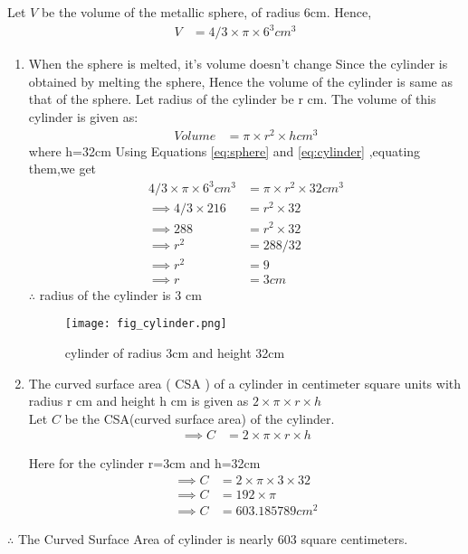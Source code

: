 \documentclass[journal,12pt,twocolumn]{IEEEtran}
\begin{document}
	Let $V$ be the volume of the metallic sphere, of radius 6cm. 
	Hence,
	\begin{align} V&=4/3 \times \pi \times 6^3 cm^3 
		\label{eq:sphere}
	\end{align} 
	\begin{enumerate}[label=(\roman*)]
		\item When the sphere is melted, it's volume doesn't change
		Since the cylinder is obtained by melting the sphere, Hence the volume of the cylinder is same as that of the sphere.
		Let radius of the cylinder be r cm.
		The volume of this cylinder is given as: 
		\begin{align} 
		Volume &= \pi \times r^2 \times h cm^3
			\label{eq:cylinder}
		\end{align}
		where h=32cm
		Using Equations 
		\eqref{eq:sphere} and 
		\eqref{eq:cylinder} 
		,equating them,we get 
		\begin{align}
		4/3 \times \pi \times 6^3 cm^3&=\pi \times r^2 \times 32 cm^3
			\\
		\implies 4/3 \times 216&=r^2 \times 32
			\\
		\implies 288&= r^2 \times 32
			\\
		\implies r^2&= 288/32
			\\
		\implies r^2&=9
			\\
		\implies r&=3cm
		\end{align} 
	$\therefore$  radius of the  cylinder is 3 cm
		
		\begin{figure}[h!]
			\centering
			\texttt{[image: fig\_cylinder.png]}
			\caption{cylinder of radius 3cm and height 32cm}
			\label{cylinder}
		\end{figure}
		\item The curved surface area ( CSA ) of a cylinder in centimeter square units with radius r cm and height h cm is given as
		$ 2 \times \pi \times r \times h $
		\\
		Let $C$ be the CSA(curved surface area) of the cylinder.
		\begin{align}	
		\implies C&=2 \times \pi \times r \times h
		\end{align}
		
		Here for the cylinder r=3cm and h=32cm\\
		\begin{align}	
		\implies C&=2 \times \pi \times 3 \times 32
			\\
		\implies C&=192 \times \pi 
			\\
		\implies C&=603.185789 cm^2 
		\end{align}
	
	\end{enumerate}
		$\therefore$ The Curved Surface Area of cylinder is nearly 603 square centimeters.
	\ifthenelse{\isundefined{\languageshorthands}}{}{\languageshorthands{\languagename}}\gnumericTableEnds
\end{document}
